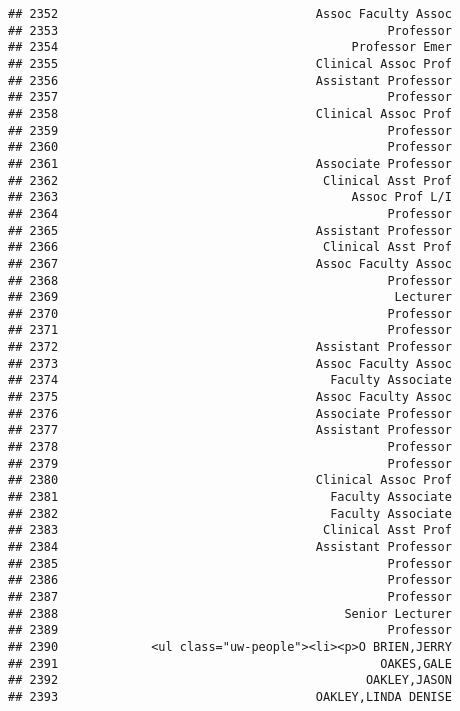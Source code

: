 \documentclass[
]{article}
\begin{document}
\begin{verbatim}
## 2352                                    Assoc Faculty Assoc
## 2353                                              Professor
## 2354                                         Professor Emer
## 2355                                    Clinical Assoc Prof
## 2356                                    Assistant Professor
## 2357                                              Professor
## 2358                                    Clinical Assoc Prof
## 2359                                              Professor
## 2360                                              Professor
## 2361                                    Associate Professor
## 2362                                     Clinical Asst Prof
## 2363                                         Assoc Prof L/I
## 2364                                              Professor
## 2365                                    Assistant Professor
## 2366                                     Clinical Asst Prof
## 2367                                    Assoc Faculty Assoc
## 2368                                              Professor
## 2369                                               Lecturer
## 2370                                              Professor
## 2371                                              Professor
## 2372                                    Assistant Professor
## 2373                                    Assoc Faculty Assoc
## 2374                                      Faculty Associate
## 2375                                    Assoc Faculty Assoc
## 2376                                    Associate Professor
## 2377                                    Assistant Professor
## 2378                                              Professor
## 2379                                              Professor
## 2380                                    Clinical Assoc Prof
## 2381                                      Faculty Associate
## 2382                                      Faculty Associate
## 2383                                     Clinical Asst Prof
## 2384                                    Assistant Professor
## 2385                                              Professor
## 2386                                              Professor
## 2387                                              Professor
## 2388                                        Senior Lecturer
## 2389                                              Professor
## 2390             <ul class="uw-people"><li><p>O BRIEN,JERRY
## 2391                                             OAKES,GALE
## 2392                                           OAKLEY,JASON
## 2393                                    OAKLEY,LINDA DENISE

\end{verbatim}
\end{document}
